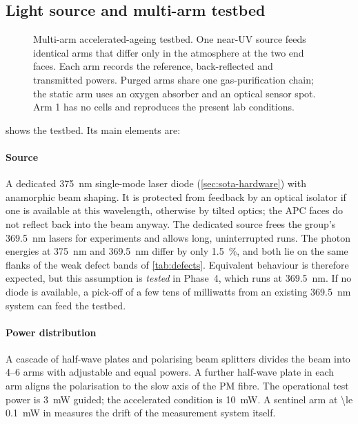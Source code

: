 \subsection{Light source and multi-arm testbed}\label{sec:testbed}
\begin{figure}[tbp]
  \centering
  \resizebox{\textwidth}{!}{}
  \caption{Multi-arm accelerated-ageing testbed. One near-UV source feeds identical arms that differ only
  in the atmosphere at the two end faces. Each arm records the reference, back-reflected and transmitted
  powers. Purged arms share one gas-purification chain; the static arm uses an oxygen absorber and an
  optical \Oxy{} sensor spot. Arm 1 has no cells and reproduces the present lab conditions.}
  \label{fig:testbed}
\end{figure}

 shows the testbed. Its main elements are:

\paragraph{Source} A dedicated \SI{375}{nm} single-mode laser diode (\cref{sec:sota-hardware}) with
anamorphic beam shaping. It is protected from feedback by an optical isolator if one is available at
this wavelength, otherwise by tilted optics; the APC faces do not reflect back into the beam anyway. The
dedicated source frees the group's \SI{369.5}{nm} lasers for experiments and allows long, uninterrupted
runs. The photon energies at \SI{375}{nm} and \SI{369.5}{nm} differ by only \SI{1.5}{\percent}, and both
lie on the same flanks of the weak defect bands of \cref{tab:defects}. Equivalent behaviour is
therefore expected, but this assumption is \emph{tested} in Phase~4, which runs at \SI{369.5}{nm}. If no diode is available, a pick-off of a few tens of milliwatts from an
existing \SI{369.5}{nm} system can feed the testbed.

\paragraph{Power distribution} A cascade of half-wave plates and polarising beam splitters divides the
beam into 4--6 arms with adjustable and equal powers. A further half-wave plate in each arm aligns the
polarisation to the slow axis of the PM fibre. The operational test power is \SI{3}{mW} guided; the
accelerated condition is \SI{10}{mW}. A sentinel arm at \SI{\le 0.1}{mW} in \Ntwo{} measures the
drift of the measurement system itself.

